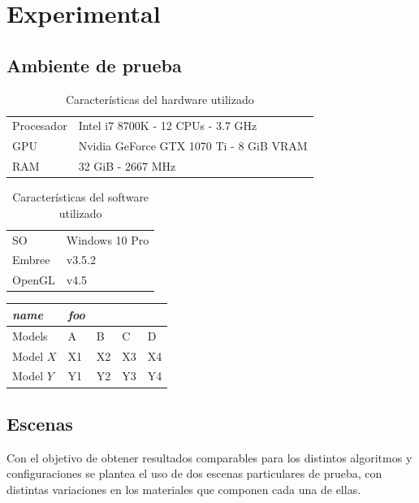 \chapter{Experimental}
\label{ch:chap05}

\section{Ambiente de prueba}
\label{sec:hardware}

\begin{table}[H]
	\begin{tabular}{ll}
		Procesador & Intel i7 8700K - 12 CPUs - 3.7 GHz       \\\cline{1-1}
		GPU        & Nvidia GeForce GTX 1070 Ti - 8 GiB  VRAM \\\cline{1-1}
		RAM        & 32 GiB - 2667 MHz                        \\\cline{1-1}
	\end{tabular}
	\caption{Características del hardware utilizado}
\end{table}

\begin{table}[H]
	\begin{tabular}{ll}
		SO & Windows 10 Pro       \\\cline{1-1}
		Embree        & v3.5.2  \\\cline{1-1}
		OpenGL        & v4.5                        \\\cline{1-1}
	\end{tabular}
	\caption{Características del software utilizado}
\end{table}

\begin{tabular}{@{} *5l @{}}    \toprule
	\textit{name} & \textit{foo} &&&  \\\midrule
	Models    & A  & B  & C  & D  \\ 
	Model $X$ & X1 & X2 & X3 & X4\\ 
	Model $Y$ & Y1 & Y2 & Y3 & Y4\\\bottomrule
	\hline
\end{tabular}
\section{Escenas}
\label{sec:escenas}

Con el objetivo de obtener resultados comparables para los distintos algoritmos y configuraciones se plantea el uso de dos escenas particulares de prueba, con distintas variaciones en los materiales que componen cada una de ellas.



